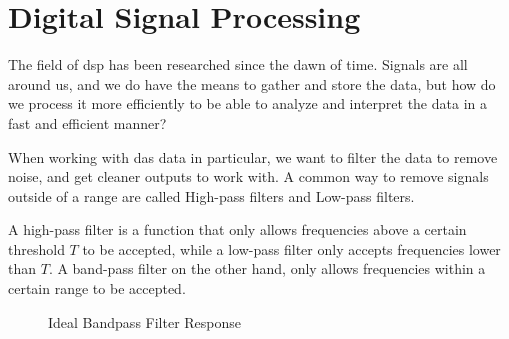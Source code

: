 \section{Digital Signal Processing}
\label{back:dsp}

The field of \acrfull{dsp} has been researched since the dawn of time. Signals are all around us, and we do have the means to gather and store the data, but how do we process it more efficiently to be able to analyze and interpret the data in a fast and efficient manner?

When working with \acrshort{das} data in particular, we want to filter the data to remove noise, and get cleaner outputs to work with. A common way to remove signals outside of a range are called High-pass filters and Low-pass filters. 

A high-pass filter is a function that only allows frequencies above a certain threshold $T$ to be accepted, while a low-pass filter only accepts frequencies lower than $T$. A band-pass filter on the other hand, only allows frequencies within a certain range to be accepted.

\begin{figure}[h]
\centering
{}
\caption{Ideal Bandpass Filter Response}
\end{figure}


